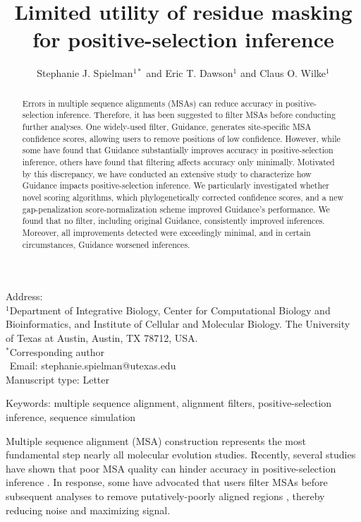 \documentclass[11pt]{article}
\begin{document}
\title{\textbf{Limited utility of residue masking for positive-selection inference}}
\author{Stephanie J. Spielman$^{1*}$ and Eric T. Dawson$^{1}$ and Claus O. Wilke$^{1}$}
\date{}

\maketitle
\noindent
Address:\\
$^1$Department of Integrative Biology, Center for Computational Biology and Bioinformatics, and Institute of Cellular and Molecular Biology.
The University of Texas at Austin, Austin, TX 78712, USA.\\

\bigskip
\noindent
$^*$Corresponding author\\
$\phantom{^*}$Email: stephanie.spielman@utexas.edu\\

\bigskip
\noindent
Manuscript type: Letter

\bigskip
\noindent Keywords: multiple sequence alignment, alignment filters, positive-selection inference, sequence simulation

\newpage
\begin{abstract}
Errors in multiple sequence alignments (MSAs) can reduce accuracy in positive-selection inference. Therefore, it has been suggested to filter MSAs before conducting further analyses. One widely-used filter, Guidance, generates site-specific MSA confidence scores, allowing users to remove positions of low confidence. However, while some have found that Guidance substantially improves accuracy in positive-selection inference, others have found that filtering affects accuracy only minimally. Motivated by this discrepancy, we have conducted an extensive study to characterize how Guidance impacts positive-selection inference. We particularly investigated whether novel scoring algorithms, which phylogenetically corrected confidence scores, and a new gap-penalization score-normalization scheme improved Guidance's performance. We found that no filter, including original Guidance, consistently improved inferences. Moreover, all improvements detected were exceedingly minimal, and in certain circumstances, Guidance worsened inferences.
\end{abstract}

Multiple sequence alignment (MSA) construction represents the most fundamental step nearly all molecular evolution studies. Recently, several studies have shown that poor MSA quality can hinder accuracy in positive-selection inference \citep{Schneider2009, Fletcher2010, MarkovaRaina2011}. In response, some have advocated that users filter MSAs before subsequent analyses to remove putatively-poorly aligned regions \citep{Privman2012,Jordan2012}, thereby reducing noise and maximizing signal.
\end{document}
